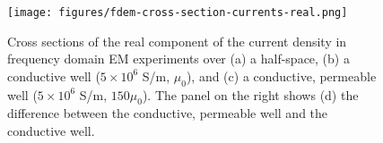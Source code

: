 \begin{figure}
    \begin{center}
    \texttt{[image: figures/fdem-cross-section-currents-real.png]}
    \end{center}
\caption{Cross sections of the real component of the current density in frequency domain EM experiments over (a) a half-space, (b) a conductive well ($5\times10^6$ S/m, $\mu_0$), and (c) a conductive, permeable well ($5\times10^6$ S/m, $150\mu_0$). The panel on the right shows (d) the difference between the conductive, permeable well and the conductive well.
}
\label{fig:fdem-cross-section-currents-real}
\end{figure}



